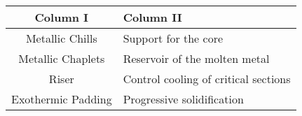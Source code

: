 \begin{table}[h!]
        \centering
        \begin{tabular}{|c|l|}
            \hline
            \textbf{Column I} & \textbf{Column II} \\
            \hline
            Metallic Chills & Support for the core \\
            \hline
            Metallic Chaplets & Reservoir of the molten metal \\
            \hline
            Riser & Control cooling of critical sections \\
            \hline
            Exothermic Padding & Progressive solidification \\
            \hline
        \end{tabular}
    \end{table}
